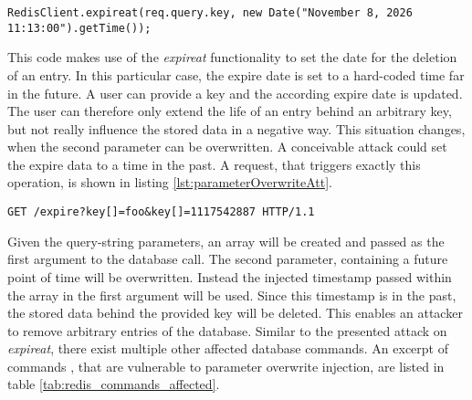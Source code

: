 \begin{lstlisting}[caption={Vulnerable NodeJS example for parameter overwrite injection against Redis}, label={lst:parameterOverwriteApp}]
RedisClient.expireat(req.query.key, new Date("November 8, 2026 11:13:00").getTime());
\end{lstlisting}

This code makes use of the \emph{expireat} functionality to set the date for the deletion of an entry. In this particular case, the expire date is set to a hard-coded time far in the future. A user can provide a key and the according expire date is updated. The user can therefore only extend the life of an entry behind an arbitrary key, but not really influence the stored data in a negative way. This situation changes, when the second parameter can be overwritten. A conceivable attack could set the expire data to a time in the past. A request, that triggers exactly this operation, is shown in listing \ref{lst:parameterOverwriteAtt}. \\

\begin{lstlisting}[caption={Attack vector against Redis for query selector injection via the query-string parameter}, label={lst:parameterOverwriteAtt}]
GET /expire?key[]=foo&key[]=1117542887 HTTP/1.1
\end{lstlisting}

Given the query-string parameters, an array will be created and passed as the first argument to the database call. The second parameter, containing a future point of time will be overwritten. Instead the injected timestamp passed within the array in the first argument will be used. Since this timestamp is in the past, the stored data behind the provided key will be deleted. This enables an attacker to remove arbitrary entries of the database. Similar to the presented attack on \emph{expireat}, there exist multiple other affected database commands. An excerpt of commands \cite{Sanfilippo2016}, that are vulnerable to parameter overwrite injection, are listed in table \ref{tab:redis_commands_affected}. \\

